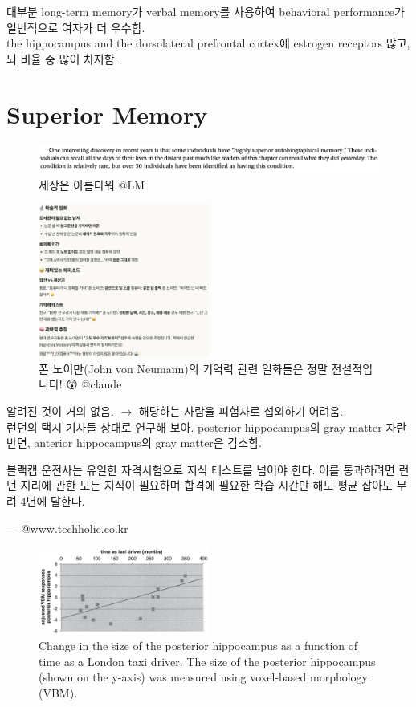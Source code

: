 \documentclass[../note.tex]{subfiles}
\begin{document}
\begin{itemize}
대부분 long-term memory가 verbal memory를 사용하여 behavioral performance가 일반적으로 여자가 더 우수함.\\
the hippocampus and the dorsolateral prefrontal cortex에 estrogen receptors 많고, 뇌 비율 중 많이 차지함.

\section{Superior Memory}
\begin{figure}[htbp]
  \centering
  \includegraphics[width=\textwidth]{image/superior_memory}
  \caption{세상은 아름다워 @LM}
  \label{fig:superior_memory}
\end{figure}

\begin{figure}[htbp]
  \centering
  \includegraphics[width=0.5\textwidth]{image/von}
  \caption{폰 노이만(John von Neumann)의 기억력 관련 일화들은 정말 전설적입니다! 😲
 @claude}
  \label{fig:von}
\end{figure}

알려진 것이 거의 없음. $\longrightarrow$ 해당하는 사람을 피험자로 섭외하기 어려움.\\

런던의 택시 기사들 상대로 연구해 보아. posterior hippocampus의 gray matter 자란 반면, anterior hippocampus의 gray matter은 감소함.

\epigraph{블랙캡 운전사는 유일한 자격시험으로 지식 테스트를 넘어야 한다. 이를 통과하려면 런던 지리에 관한 모든 지식이 필요하며 합격에 필요한 학습 시간만 해도 평균 잡아도 무려 4년에 달한다.}{--- @www.techholic.co.kr}

\begin{figure}[htbp]
  \centering
  \includegraphics[width=0.5\textwidth]{image/taxi}
  \caption{Change in the size of the posterior hippocampus as a function of time as a
London taxi driver. The size of the posterior hippocampus (shown on the y-axis) was
measured using voxel-based morphology (VBM).}
  \label{fig:taxi}
\end{figure}


\end{itemize}
\end{document}
